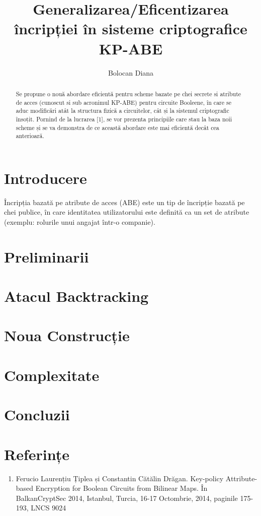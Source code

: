\documentclass[12pt,a4paper]{article}
\title{Generalizarea/Eficentizarea încripției în sisteme criptografice KP-ABE}
\author{Bolocan Diana}
\begin{document}
\maketitle

\begin{abstract}
Se propune o nouă abordare eficientă pentru scheme bazate pe chei secrete si atribute de acces (cunoscut si sub acronimul KP-ABE) pentru circuite Booleene, în care se aduc modificări atât la structura fizică a circuitelor, cât și la sistemul criptografic însoțit. Pornind de la lucrarea [1], se vor prezenta principiile care stau la baza noii scheme și se va demonstra de ce această abordare este mai eficientă decât cea anterioară. 
\end{abstract}

\section{Introducere}
Încripția bazată pe atribute de acces (ABE) este un tip de încripție bazată pe chei publice, în care identitatea utilizatorului este definită ca un set de atribute (exemplu: rolurile unui angajat într-o companie).  

\section{Preliminarii}

\section{Atacul Backtracking}

\section{Noua Construcție}

\section{Complexitate}

\section{Concluzii}

\section{Referințe}
\begin{enumerate}
	\item Ferucio Laurențiu Țiplea și Constantin Cătălin Drăgan. Key-policy Attribute-based Encryption for Boolean Circuits from Bilinear Maps. În BalkanCryptSec 2014, Istanbul, Turcia, 16-17 Octombrie, 2014, paginile 175-193, LNCS 9024
\end{enumerate}
\end{document}
